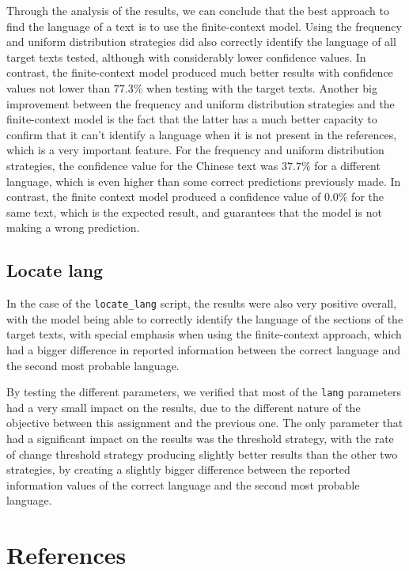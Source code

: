 \documentclass{article}
\begin{document}
Through the analysis of the results, we can conclude that the best approach to find the language of a text is to use the finite-context model.
Using the frequency and uniform distribution strategies did also correctly identify the language of all target texts tested, although with considerably lower confidence values.
In contrast, the finite-context model produced much better results with confidence values not lower than $77.3\%$ when testing with the target texts.
Another big improvement between the frequency and uniform distribution strategies and the finite-context model is the fact that the latter has a much better capacity to confirm
that it can't identify a language when it is not present in the references, which is a very important feature. For the frequency and uniform distribution strategies, the confidence
value for the Chinese text was $37.7\%$ for a different language, which is even higher than some correct predictions previously made. In contrast, the finite context model produced a
confidence value of $0.0\%$ for the same text, which is the expected result, and guarantees that the model is not making a wrong prediction.

\subsection{Locate lang}
\label{subsec:conclusion:locate_lang}

In the case of the \texttt{locate\_lang} script, the results were also very positive overall, with the model being able to correctly identify the language of the sections of the target texts,
with special emphasis when using the finite-context approach, which had a bigger difference in reported information between the correct language and the second most probable language.

By testing the different parameters, we verified that most of the \texttt{lang} parameters had a very small impact on the results, due to the different nature of the objective between this
assignment and the previous one. The only parameter that had a significant impact on the results was the threshold strategy, with the rate of change threshold strategy producing
slightly better results than the other two strategies, by creating a slightly bigger difference between the reported information values of the correct language and the second most probable language.

\section{References}


\end{document}
